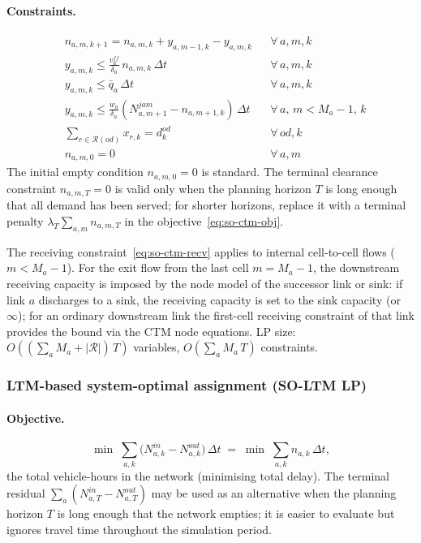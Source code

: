 \paragraph{Constraints.}
\begin{align}
  & n_{a,m,k+1} = n_{a,m,k} + y_{a,m-1,k} - y_{a,m,k}
    && \forall\, a,m,k
    \label{eq:so-ctm-balance}\\
  & y_{a,m,k} \le \tfrac{v^{ff}_a}{\delta_a}\,n_{a,m,k}\,\Delta t
    && \forall\, a,m,k
    \label{eq:so-ctm-send-vf}\\
  & y_{a,m,k} \le \bar{q}_a\,\Delta t
    && \forall\, a,m,k\\
  & y_{a,m,k} \le \tfrac{w_a}{\delta_a}
                  (N^{jam}_{a,m+1} - n_{a,m+1,k})\,\Delta t
    && \forall\, a,\, m < M_a-1,\, k
    \label{eq:so-ctm-recv}\\
  & \textstyle\sum_{r \in \mathcal{R}(od)} x_{r,k} = d^{od}_k
    && \forall\, od, k\\
  & n_{a,m,0} = 0
    && \forall\, a,m
    \label{eq:so-ctm-ic}
\end{align}
The initial empty condition $n_{a,m,0}=0$ is standard.  The terminal
clearance constraint $n_{a,m,T}=0$ is valid only when the planning
horizon $T$ is long enough that all demand has been served; for shorter
horizons, replace it with a terminal penalty $\lambda_T\sum_{a,m}n_{a,m,T}$
in the objective~\eqref{eq:so-ctm-obj}.

The receiving constraint~\eqref{eq:so-ctm-recv} applies to internal
cell-to-cell flows ($m < M_a-1$).  For the exit flow from the last
cell $m = M_a-1$, the downstream receiving capacity is imposed by the
node model of the successor link or sink: if link $a$ discharges to a
sink, the receiving capacity is set to the sink capacity (or $\infty$);
for an ordinary downstream link the first-cell receiving constraint of
that link provides the bound via the CTM node equations.
LP size: $O((\sum_a M_a + |\mathcal{R}|)\,T)$ variables,
$O(\sum_a M_a\,T)$ constraints.

\subsubsection{LTM-based system-optimal assignment (SO-LTM LP)}
\label{sec:traffic-ltm-so-lp}

\paragraph{Objective.}
\begin{equation}
  \min\; \sum_{a,k} \bigl(N^{in}_{a,k} - N^{out}_{a,k}\bigr)\,\Delta t
  \;=\;
  \min\; \sum_{a,k} n_{a,k}\,\Delta t,
  \label{eq:so-ltm-obj}
\end{equation}
the total vehicle-hours in the network (minimising total delay).
The terminal residual $\sum_a(N^{in}_{a,T}-N^{out}_{a,T})$ may be used
as an alternative when the planning horizon $T$ is long enough that the
network empties; it is easier to evaluate but ignores travel time
throughout the simulation period.

